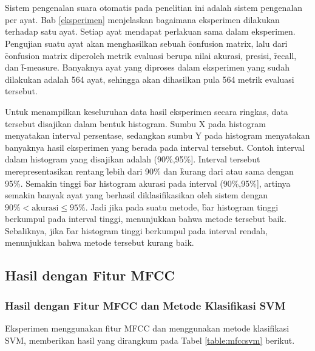 \chapter{\babLima}

Sistem pengenalan suara otomatis pada penelitian ini adalah sistem pengenalan per ayat. Bab \ref{eksperimen} menjelaskan bagaimana eksperimen dilakukan terhadap satu ayat. Setiap ayat mendapat perlakuan sama dalam eksperimen. Pengujian suatu ayat akan menghasilkan sebuah \f{confusion matrix}, lalu dari \f{confusion matrix} diperoleh metrik evaluasi berupa nilai akurasi, presisi, \f{recall}, dan \f{f-measure}. Banyaknya ayat yang diproses dalam eksperimen yang sudah dilakukan adalah 564 ayat, sehingga akan dihasilkan pula 564 metrik evaluasi tersebut.

Untuk menampilkan keseluruhan data hasil eksperimen secara ringkas, data tersebut disajikan dalam bentuk histogram. Sumbu X pada histogram menyatakan interval persentase, sedangkan sumbu Y pada histogram menyatakan banyaknya hasil eksperimen yang berada pada interval tersebut. Contoh interval dalam histogram yang disajikan adalah (90\%,95\%]. Interval tersebut merepresentasikan rentang \f{lebih dari} 90\% dan \f{kurang dari atau sama dengan} 95\%. Semakin tinggi \f{bar} histogram akurasi pada interval (90\%,95\%], artinya semakin banyak ayat yang berhasil diklasifikasikan oleh sistem dengan $90\%<\text{akurasi}\leq95\%$. Jadi jika pada suatu metode, \f{bar} histogram tinggi berkumpul pada interval tinggi, menunjukkan bahwa metode tersebut baik. Sebaliknya, jika \f{bar} histogram tinggi berkumpul pada interval rendah, menunjukkan bahwa metode tersebut kurang baik.

\section{Hasil dengan Fitur MFCC}

  \subsection{Hasil dengan Fitur MFCC dan Metode Klasifikasi SVM}
  Eksperimen menggunakan fitur MFCC dan menggunakan metode klasifikasi SVM, memberikan hasil yang dirangkum pada Tabel \ref{table:mfccsvm} berikut.

